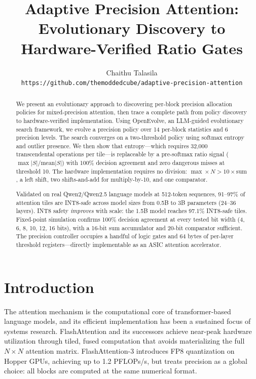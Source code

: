 \documentclass[10pt,twocolumn]{article}
\title{\textbf{Adaptive Precision Attention:\\
Evolutionary Discovery to Hardware-Verified Ratio Gates}}
\author{
  Chaithu Talasila\\
  \texttt{https://github.com/themoddedcube/adaptive-precision-attention}
}
\date{}
\begin{document}
\maketitle
\thispagestyle{fancy}

\begin{abstract}
We present an evolutionary approach to discovering per-block precision
allocation policies for mixed-precision attention, then trace a complete
path from policy discovery to hardware-verified implementation.
Using OpenEvolve, an LLM-guided evolutionary search framework, we evolve a
precision policy over 14 per-block statistics and 6 precision levels.
The search converges on a two-threshold policy using softmax entropy and
outlier presence. We then show that entropy---which requires 32{,}000
transcendental operations per tile---is replaceable by a pre-softmax
ratio signal ($\max|S|/\mathrm{mean}|S|$) with 100\% decision agreement
and zero dangerous misses at threshold 10. The hardware implementation
requires no division: $\max \times N > 10 \times \mathrm{sum}$, a left
shift, two shifts-and-add for multiply-by-10, and one comparator.

Validated on real Qwen2/Qwen2.5 language models at 512-token sequences,
91--97\% of attention tiles are INT8-safe across model sizes from 0.5B
to 3B parameters (24--36 layers). INT8 safety \emph{improves} with scale:
the 1.5B model reaches 97.1\% INT8-safe tiles. Fixed-point simulation
confirms 100\% decision agreement at every tested bit width (4, 6, 8,
10, 12, 16 bits), with a 16-bit sum accumulator and 20-bit comparator
sufficient. The precision controller occupies a handful of logic gates
and 64 bytes of per-layer threshold registers---directly implementable
as an ASIC attention accelerator.
\end{abstract}

\section{Introduction}

The attention mechanism is the computational core of transformer-based
language models, and its efficient implementation has been a sustained
focus of systems research. FlashAttention \citep{dao2022flashattention}
and its successors \citep{dao2023flashattention2,shah2024flashattention3}
achieve near-peak hardware utilization through tiled, fused computation
that avoids materializing the full $N \times N$ attention matrix.
FlashAttention-3 introduces FP8 quantization on Hopper GPUs, achieving
up to 1.2 PFLOPs/s, but treats precision as a global choice: all blocks
are computed at the same numerical format.
\end{document}
